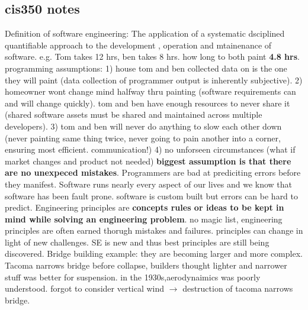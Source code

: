 \documentclass[10pt]{article}
\begin{document}
\begin{landscape}
\begin{multicols*}{6}
\section{cis350 notes}
\tiny 
Definition of software engineering: The application of a systematic dsciplined quantifiable approach to the development , operation and mtainenance of software. e.g. Tom takes 12 hrs, ben takes 8 hrs. how long to both paint \textbf{4.8 hrs}. 
programming assumptions:  1) house tom and ben collected data on is the one they will paint (data collection of programmer output is inherently subjective). 2) homeowner wont change mind halfway thru painting (software requirements can and will change quickly). tom and ben have enough resources to never share it (shared software assets must be shared and maintained across multiple developers). 3) tom and ben will never do anything to slow each other down (never painting same thing twice, never going to pain another into a corner, ensuring most efficient. communication!) 4) no unforseen circumstances (what if market changes and product not needed) \textbf{biggest assumption is that there are no unexpeced mistakes}.
Programmers are bad at prediciting errors before they manifest. Software runs nearly every aspect of our lives and we know that software has been fault prone. software is custom built but errors can be hard to predict.
Engineering principles are \textbf{concepts rules or ideas to be kept in mind while solving an engineering problem}. no magic list, engineering principles are often earned thorugh mistakes and failures. principles can change in light of new challenges. SE is new and thus best principles are still being discovered. Bridge building example: they are becoming larger and more complex. Tacoma narrows bridge before collapse, builders thought lighter and narrower stuff was better for suspension. in the 1930s,aerodynaimics was poorly understood. forgot to consider vertical wind $\rightarrow$ destruction of tacoma narrows bridge.

\end{multicols*}
\end{landscape}
\end{document}
